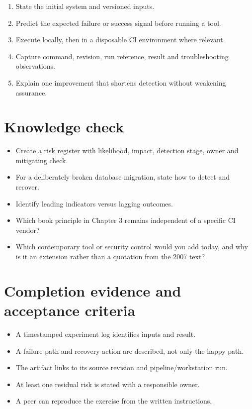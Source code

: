 \documentclass[11pt,letterpaper]{article}
\begin{document}
\begin{enumerate}
\item State the initial system and versioned inputs.
\item Predict the expected failure or success signal before running a tool.
\item Execute locally, then in a disposable CI environment where relevant.
\item Capture command, revision, run reference, result and troubleshooting observations.
\item Explain one improvement that shortens detection without weakening assurance.
\end{enumerate}
\section{Knowledge check}
\begin{itemize}
\item Create a risk register with likelihood, impact, detection stage, owner and mitigating check.
\item For a deliberately broken database migration, state how to detect and recover.
\item Identify leading indicators versus lagging outcomes.
\item Which book principle in Chapter 3 remains independent of a specific CI vendor?
\item Which contemporary tool or security control would you add today, and why is it an extension rather than a quotation from the 2007 text?
\end{itemize}
\section{Completion evidence and acceptance criteria}
\begin{itemize}
\item A timestamped experiment log identifies inputs and result.
\item A failure path and recovery action are described, not only the happy path.
\item The artifact links to its source revision and pipeline/workstation run.
\item At least one residual risk is stated with a responsible owner.
\item A peer can reproduce the exercise from the written instructions.
\end{itemize}
\end{document}

